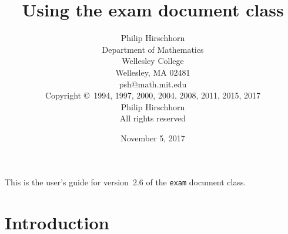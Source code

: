 \documentclass[12pt]{exam}
\newcommand{\docversion}{2.6}
\newcommand{\docdate}{November 5, 2017}
\begin{document}
\title{Using the exam document class}

\author{Philip Hirschhorn\\
  Department of Mathematics\\
  Wellesley College\\
  Wellesley, MA 02481\\
  psh@math.mit.edu\\[\bigskipamount]
  Copyright \copyright~1994, 1997, 2000, 2004, 2008, 2011, 2015, 2017\\
  Philip Hirschhorn\\
  All rights reserved}

\date{\docdate}

\maketitle

\begin{center}
  \small
  This is the user's guide for version~\docversion{} of the
  \verb"exam" document class. 
\end{center}

\tableofcontents

\section{Introduction}
\end{document}
